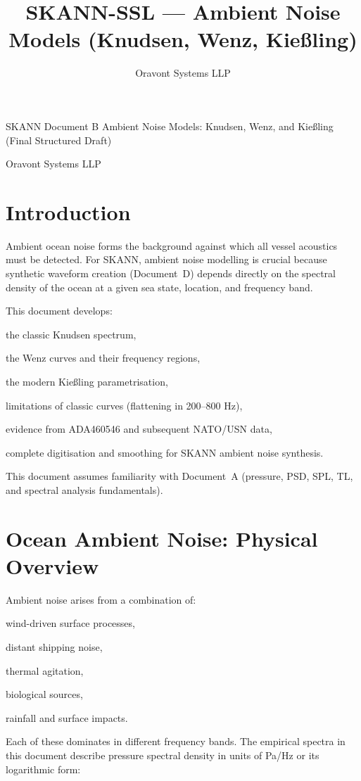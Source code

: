 \documentclass[12pt]{article}
\begin{document}
\title{SKANN-SSL --- Ambient Noise Models (Knudsen, Wenz, Kießling)}
\author{Oravont Systems LLP}
\date{}
\maketitle

SKANN Document B
Ambient Noise Models:
Knudsen, Wenz, and Kießling
(Final Structured Draft)

Oravont Systems LLP

\section*{Introduction}
Ambient ocean noise forms the background against which all vessel acoustics must be detected. For SKANN, ambient noise modelling is crucial because synthetic waveform creation (Document D) depends directly on the spectral density  of the ocean at a given sea state, location, and frequency band.

This document develops:

the classic Knudsen spectrum,

the Wenz curves and their frequency regions,

the modern Kießling parametrisation,

limitations of classic curves (flattening in 200–800 Hz),

evidence from ADA460546 and subsequent NATO/USN data,

complete digitisation and smoothing for SKANN ambient noise synthesis.

This document assumes familiarity with Document A (pressure, PSD, SPL, TL, and spectral analysis fundamentals).

\section*{Ocean Ambient Noise: Physical Overview}
Ambient noise arises from a combination of:

wind-driven surface processes,

distant shipping noise,

thermal agitation,

biological sources,

rainfall and surface impacts.

Each of these dominates in different frequency bands. The empirical spectra in this document describe pressure spectral density in units of Pa/Hz or its logarithmic form:
\end{document}
